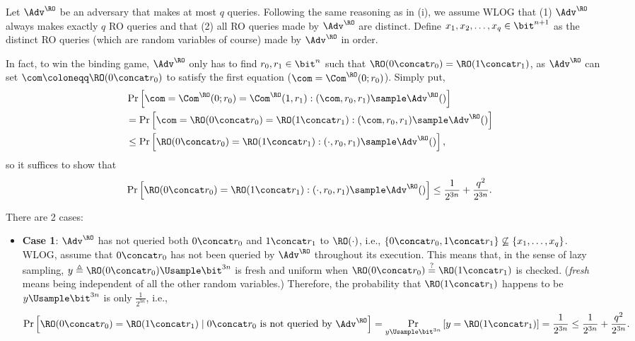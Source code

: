 \begin{answer}[ii]
    Let $\Adv^{\RO}$ be an adversary that makes at most $q$ queries.
    Following the same reasoning as in (i), we assume WLOG that (1) $\Adv^{\RO}$ always makes exactly $q$ RO queries and that (2) all RO queries made by $\Adv^{\RO}$ are distinct. 
    Define $x_1, x_2,\ldots, x_q \in\bit^{n+1}$ as the distinct RO queries (which are random variables of course) made by $\Adv^{\RO}$ in order. 

    In fact, to win the binding game, $\Adv^\RO$ only has to find $r_0, r_1\in\bit^n$ such that $\RO(0\concat r_0)=\RO(1\concat r_1)$, as $\Adv^\RO$ can set $\com\coloneqq \RO(0\concat r_0)$ to satisfy the first equation ($\com=\Com^\RO(0; r_0)$). Simply put,
    \begin{align*}
        &\Pr\left[\com=\Com^\RO(0; r_0)=\Com^\RO(1, r_1) : (\com, r_0, r_1)\sample \Adv^\RO() \right]\\
        &= \Pr\left[\com=\RO(0\concat r_0)=\RO(1\concat r_1) : (\com, r_0, r_1)\sample \Adv^\RO() \right]\\
        &\le \Pr\left[\RO(0\concat r_0)=\RO(1\concat r_1) : (\cdot, r_0, r_1)\sample \Adv^\RO() \right],
    \end{align*}
    so it suffices to show that
    \begin{equation}\label{eq:p3-2-1}
        \Pr\left[\RO(0\concat r_0)=\RO(1\concat r_1) : (\cdot, r_0, r_1)\sample \Adv^\RO() \right]\le \frac{1}{2^{3n}}+ \frac{q^2}{2^{3n}}.
    \end{equation}

    There are 2 cases:
    \begin{itemize}
        \item \textbf{Case 1}: $\Adv^\RO$ has not queried both $0\concat r_0$ and $1\concat r_1$ to $\RO(\cdot)$, i.e., $\{0\concat r_0, 1\concat r_1\}\not\subseteq \{x_1,\ldots, x_q\}$.\\
        WLOG, assume that $0\concat r_0$ has not been queried by $\Adv^\RO$ throughout its execution. This means that, in the sense of lazy sampling, $y\triangleq \RO(0\concat r_0)\Usample \bit^{3n}$ is fresh and uniform when $\RO(0\concat r_0)\stackrel{?}= \RO(1\concat r_1)$ is checked. (\textit{fresh} means being independent of all the other random variables.) Therefore, the probability that $\RO(1\concat r_1)$ happens to be $y \Usample \bit^{3n}$ is only $\frac{1}{2^{3n}}$, i.e.,
        \[
            \Pr\left[\RO(0\concat r_0)=\RO(1\concat r_1) \mid 0\concat r_0 \textrm{ is not queried by } \Adv^\RO \right]
            =\Pr_{y\Usample\bit^{3n}}\left[y=\RO(1\concat r_1) \right]
            =\frac{1}{2^{3n}}
            \le \frac{1}{2^{3n}}+ \frac{q^2}{2^{3n}}.
        \]


\end{itemize}
\end{answer}
